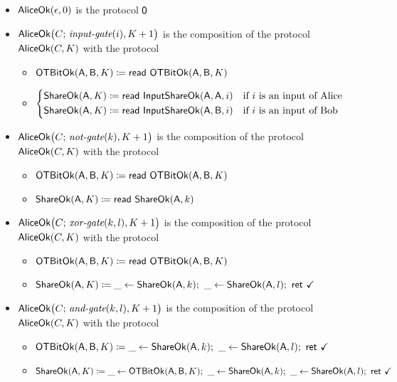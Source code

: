 \begin{itemize}
\item $\mathsf{AliceOk}(\epsilon,0)$ is the protocol $\mathsf{0}$
\item $\mathsf{AliceOk}\big(C; \, \textit{input-gate}(i),K+1\big)$ is the composition of the protocol $\mathsf{AliceOk}(C,K)$ with the protocol
\begin{itemize}
\item $\mathsf{OTBitOk}(\mathsf{A},\mathsf{B},K) \coloneqq \mathsf{read} \ \mathsf{OTBitOk}(\mathsf{A},\mathsf{B},K)$
\item $\begin{cases*} \ShareOk(\A,K) \coloneqq \read{\InputShareOk(\A,\A,i)} & \text{if $i$ is an input of Alice} \\ \ShareOk(\A,K) \coloneqq \read{\InputShareOk(\A,\B,i)} & \text{if $i$ is an input of Bob} \end{cases*}$
\end{itemize}
\item $\mathsf{AliceOk}\big(C; \, \textit{not-gate}(k),K+1\big)$ is the composition of the protocol $\mathsf{AliceOk}(C,K)$ with the protocol
\begin{itemize}
\item $\mathsf{OTBitOk}(\mathsf{A},\mathsf{B},K) \coloneqq \mathsf{read} \ \mathsf{OTBitOk}(\mathsf{A},\mathsf{B},K)$
\item $\mathsf{ShareOk}(\mathsf{A},K) \coloneqq \mathsf{read} \ \mathsf{ShareOk}(\mathsf{A},k)$
\end{itemize}
\item $\mathsf{AliceOk}\big(C; \, \textit{xor-gate}(k,l),K+1\big)$ is the composition of the protocol $\mathsf{AliceOk}(C,K)$ with the protocol
\begin{itemize}
\item $\mathsf{OTBitOk}(\mathsf{A},\mathsf{B},K) \coloneqq \mathsf{read} \ \mathsf{OTBitOk}(\mathsf{A},\mathsf{B},K)$
\item $\ShareOk(\A,K) \coloneqq \_ \leftarrow \ShareOk(\A,k); \ \_ \leftarrow \ShareOk(\A,l); \ \ret{\checkmark}$
\end{itemize}
\item $\mathsf{AliceOk}\big(C; \, \textit{and-gate}(k,l),K+1\big)$ is the composition of the protocol $\mathsf{AliceOk}(C,K)$ with the protocol
\begin{itemize}
\item $\OTBitOk(\A,\B,K) \coloneqq \_ \leftarrow \ShareOk(\A,k); \ \_ \leftarrow \ShareOk(\A,l); \ \ret{\checkmark}$
\item $\mathsf{ShareOk}(\mathsf{A},K) \coloneqq \_ \leftarrow \mathsf{OTBitOk}(\mathsf{A},\mathsf{B},K); \ \_ \leftarrow \mathsf{ShareOk}(\mathsf{A},k); \ \_ \leftarrow \mathsf{ShareOk}(\mathsf{A},l); \ \mathsf{ret} \ \checkmark$
\end{itemize}
\end{itemize}

